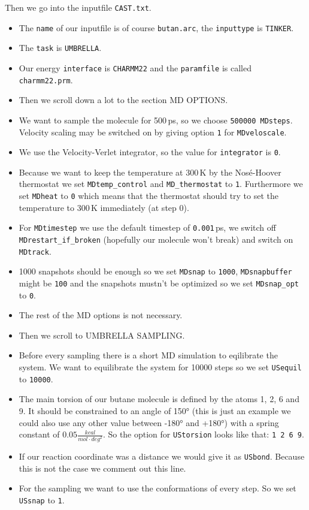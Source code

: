 \documentclass[a4paper,11pt]{scrartcl}
\begin{document}
Then we go into the inputfile \texttt{CAST.txt}.
\begin{itemize}
	\item The \texttt{name} of our inputfile is of course \texttt{butan.arc}, the \texttt{inputtype} is \texttt{TINKER}.
	\item The \texttt{task} is \texttt{UMBRELLA}.
	\item Our energy \texttt{interface} is \texttt{CHARMM22} and the \texttt{paramfile} is called \texttt{charmm22.prm}. 
	\item Then we scroll down a lot to the section MD OPTIONS.
	\item We want to sample the molecule for 500\,ps, so we choose \texttt{500000 MDsteps}. Velocity scaling may be switched on by giving option \texttt{1} for \texttt{MDveloscale}.
	\item We use the Velocity-Verlet integrator, so the value for \texttt{integrator} is \texttt{0}.
	\item Because we want to keep the temperature at 300\,K by the Nosé-Hoover thermostat we set \texttt{MDtemp\_control} and \texttt{MD\_thermostat} to \texttt{1}. Furthermore we set \texttt{MDheat} to \texttt{0} which means that the thermostat should try to set the temperature to 300\,K immediately (at step 0).
	\item For \texttt{MDtimestep} we use the default timestep of \texttt{0.001}\,ps, we switch off \texttt{MDrestart\_if\_broken} (hopefully our molecule won't break) and switch on \texttt{MDtrack}.
	\item 1000 snapshots should be enough so we set \texttt{MDsnap} to \texttt{1000}, \texttt{MDsnapbuffer} might be \texttt{100} and the snapshots mustn't be optimized so we set \texttt{MDsnap\_opt} to \texttt{0}.
	\item The rest of the MD options is not necessary.
	\item Then we scroll to UMBRELLA SAMPLING.
	\item Before every sampling there is a short MD simulation to eqilibrate the system. We want to equilibrate the system for 10000 steps so we set \texttt{USequil} to \texttt{10000}. 
	\item The main torsion of our butane molecule is defined by the atoms 1, 2, 6 and 9. It should be constrained to an angle of 150° (this is just an example we could also use any other value between -180° and +180°) with a spring constant of $0.05 \frac{kcal}{mol \cdot deg^2}$. So the option for \texttt{UStorsion} looks like that: \mbox{\texttt{1 2 6 9}}.
	\item If our reaction coordinate was a distance we would give it as \texttt{USbond}. Because this is not the case we comment out this line.
	\item For the sampling we want to use the conformations of every step. So we set \texttt{USsnap} to \texttt{1}.
\end{itemize}
\end{document}
